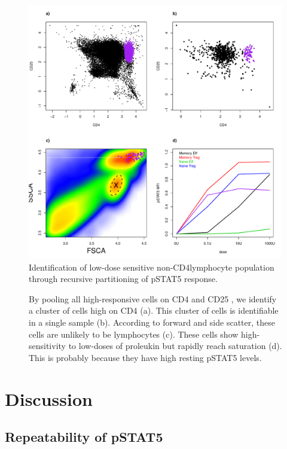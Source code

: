 \hspace{-2cm}
\begin{figure}[h]
\centering
\includegraphics[scale=.5]{IL2/figures/new-cell-subset.pdf}
{ Identification of low-dose sensitive non-CD4\positive lymphocyte population through recursive partitioning of pSTAT5 response. }
{
  By pooling all high-responsive cells on CD4 and CD25 , we identify a cluster of cells high on CD4 (a).
  This cluster of cells is identifiable in a single sample (b).
  According to forward and side scatter, these cells are unlikely to be lymphocytes (c).
  These cells show high-sensitivity to low-doses of proleukin but rapidly reach saturation (d).
  This is probably because they have high resting pSTAT5 levels.
  
}
\end{figure}




\section{Discussion}

\subsection{Repeatability of pSTAT5}



